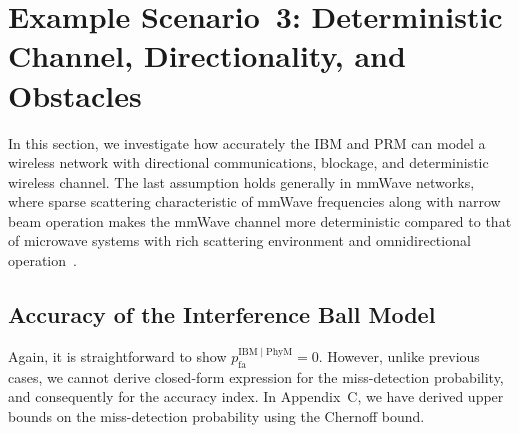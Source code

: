 \documentclass[12pt, draftclsnofoot, onecolumn]{IEEEtran}
\begin{document}
\section{Example Scenario~3: Deterministic Channel, Directionality, and Obstacles}\label{sec: Scenarios3}
In this section, we investigate how accurately the IBM and PRM can model a wireless network with directional communications, blockage, and deterministic wireless channel. The last assumption holds generally in mmWave networks, where sparse scattering characteristic of mmWave frequencies along with narrow beam operation makes the mmWave channel more deterministic compared to that of microwave systems with rich scattering environment and omnidirectional operation~\cite{Rappaport2015wideband}.

\subsection{Accuracy of the Interference Ball Model}\label{subsec: example-3-IBM}
Again, it is straightforward to show $p_{\mathrm{fa}}^{{\mathrm{IBM}} \mid {\mathrm{PhyM}}} = 0$. However, unlike previous cases, we cannot derive closed-form expression for the miss-detection probability, and consequently for the accuracy index. In Appendix~C, we have derived upper bounds on the miss-detection probability using the Chernoff bound.
\end{document}
